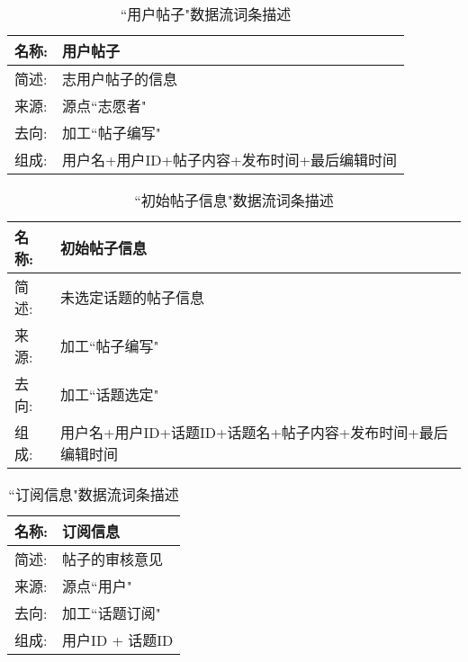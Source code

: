 \begin{table}[H]  
\caption{``用户帖子"数据流词条描述}  
\begin{center}  
    \begin{tabular}{l p{11cm}} 
        \hline
        \quad 名称:  &  用户帖子 \\
        \hline
        \quad 简述:  & 志用户帖子的信息 \\
        \hline
        \quad 来源:  & 源点``志愿者" \\
        \hline
        \quad 去向:  & 加工``帖子编写" \\
        \hline
        \quad 组成:  & 用户名+用户ID+帖子内容+发布时间+最后编辑时间 \\
        \hline
    \end{tabular}
    \label{tab1}
\end{center}
\end{table}

\begin{table}[H]  
\caption{``初始帖子信息"数据流词条描述}  
\begin{center}  
    \begin{tabular}{l p{11cm}} 
        \hline
        \quad 名称:  &   初始帖子信息 \\
        \hline
        \quad 简述:  & 未选定话题的帖子信息 \\
        \hline
        \quad 来源:  & 加工``帖子编写" \\
        \hline
        \quad 去向:  & 加工``话题选定" \\
        \hline
        \quad 组成:  & 用户名+用户ID+话题ID+话题名+帖子内容+发布时间+最后编辑时间 \\
        \hline
    \end{tabular}
    \label{tab1}
\end{center}
\end{table}

\begin{table}[H]  
\caption{``订阅信息"数据流词条描述}  
\begin{center}  
    \begin{tabular}{l p{11cm}} 
        \hline
        \quad 名称:  & 订阅信息 \\
        \hline
        \quad 简述:  & 帖子的审核意见 \\
        \hline
        \quad 来源:  & 源点``用户" \\
        \hline
        \quad 去向:  & 加工``话题订阅" \\
        \hline
        \quad 组成:  & 用户ID + 话题ID \\
        \hline
    \end{tabular}
    \label{tab1}
\end{center}
\end{table}

